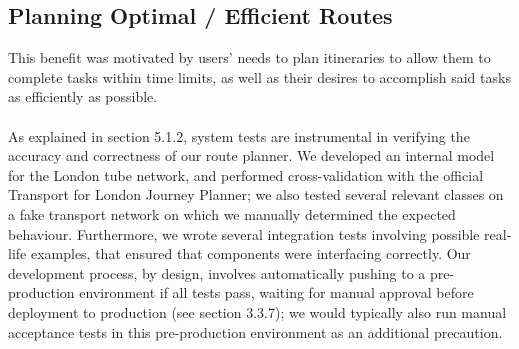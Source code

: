 \documentclass[a4paper, 10pt]{report}
\begin{document}
\subsection{Planning Optimal / Efficient Routes}
This benefit was motivated by users' needs to plan itineraries to allow them to complete tasks within time limits, as well as their desires to accomplish said tasks as efficiently as possible.\\\\
As explained in section 5.1.2, system tests are instrumental in verifying the accuracy and correctness of our route planner. We developed an internal model for the London tube network, and performed cross-validation with the official Transport for London Journey Planner; we also tested several relevant classes on a fake transport network on which we manually determined the expected behaviour.
Furthermore, we wrote several integration tests involving possible real-life examples, that ensured that components were interfacing correctly. Our development process, by design, involves automatically pushing to a pre-production environment if all tests pass, waiting for manual approval before deployment to production (see section 3.3.7); we would typically also run manual acceptance tests in this pre-production environment as an additional precaution.
\end{document}
